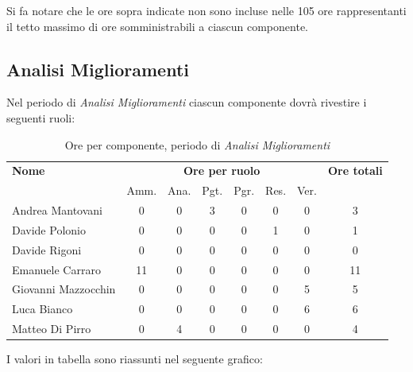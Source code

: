 Si fa notare che le ore sopra indicate non sono incluse nelle 105 ore rappresentanti il tetto massimo di ore somministrabili a ciascun componente.


\pagebreak
\subsection{Analisi Miglioramenti}
Nel periodo di \textit{Analisi Miglioramenti} ciascun componente dovrà rivestire i seguenti ruoli:

\begin{table}[H]
\begin{tabular}{lccccccc}
\toprule
    \textbf{Nome}  & \multicolumn{6}{c}{\textbf{Ore per ruolo}} & \textbf{Ore totali} \\
     & Amm. & Ana. & Pgt. & Pgr. & Res. & Ver. & \\
    \midrule
    
	   Andrea Mantovani & 0 & 0 & 3 & 0 & 0 & 0 & 3 \\
	     Davide Polonio & 0 & 0 & 0 & 0 & 1 & 0 & 1 \\
	      Davide Rigoni & 0 & 0 & 0 & 0 & 0 & 0 & 0 \\
	   Emanuele Carraro & 11 & 0 & 0 & 0 & 0 & 0 & 11 \\
	Giovanni Mazzocchin & 0 & 0 & 0 & 0 & 0 & 5 & 5 \\
	        Luca Bianco & 0 & 0 & 0 & 0 & 0 & 6 & 6 \\
	    Matteo Di Pirro & 0 & 4 & 0 & 0 & 0 & 0 & 4 \\
    
    \bottomrule
\end{tabular}
\caption{Ore per componente, periodo di \textit{Analisi Miglioramenti}}
\end{table}


I valori in tabella sono riassunti nel seguente grafico: \\ 

